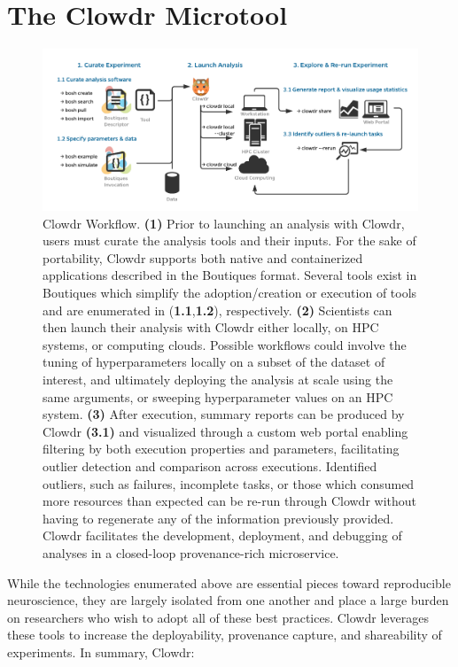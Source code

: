 \documentclass[fleqn,12pt]{SelfArx_ch} %
\begin{document}
\clearpage
\section{The Clowdr Microtool}

\begin{figure}[h!]
\centering
\includegraphics[width=\textwidth]{./figures/fig1.pdf}
\caption{Clowdr Workflow. \textbf{(1)} Prior to launching an analysis with Clowdr, users must curate the
analysis tools and their inputs. For the sake of portability, Clowdr supports both native and containerized
applications described in the Boutiques format. Several tools exist in Boutiques which simplify the adoption/creation
or execution of tools and are enumerated in (\textbf{1.1},\textbf{1.2}), respectively. \textbf{(2)} Scientists can then
launch their analysis with Clowdr either locally, on HPC systems, or computing clouds. Possible workflows could involve
the tuning of hyperparameters locally on a subset of the dataset of interest, and ultimately deploying the analysis at
scale using the same arguments, or sweeping hyperparameter values on an HPC system. \textbf{(3)} After execution,
summary reports can be produced by Clowdr \textbf{(3.1)} and visualized through a custom web portal enabling filtering
by both execution properties and parameters, facilitating outlier detection and comparison across executions.
Identified outliers, such as failures, incomplete tasks, or those which consumed more resources than expected can be
re-run through Clowdr without having to regenerate any of the information previously provided. Clowdr facilitates the
development, deployment, and debugging of analyses in a closed-loop provenance-rich microservice.}
\label{fig:ch1.1}
\end{figure}
While the technologies enumerated above are essential pieces toward reproducible neuroscience, they are largely
isolated from one another and place a large burden on researchers who wish to adopt all of these best practices. Clowdr
leverages these tools to increase the deployability, provenance capture, and shareability of experiments. In summary,
Clowdr:
\end{document}
